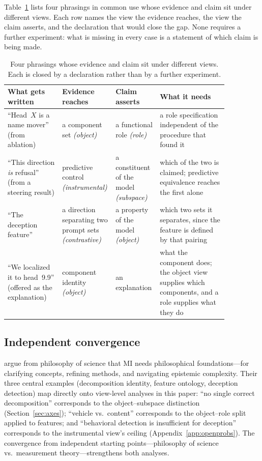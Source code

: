 \documentclass{article}
\begin{document}
Table~\ref{tab:violations} lists four phrasings in common use whose
evidence and claim sit under different views.  Each row names the view the
evidence reaches, the view the claim asserts, and the declaration that
would close the gap.  None requires a further experiment: what is missing
in every case is a statement of which claim is being made.

\begin{table}[H]
\centering
\footnotesize
\begin{tabular}{p{0.24\linewidth}p{0.17\linewidth}p{0.15\linewidth}p{0.30\linewidth}}
\toprule
\textbf{What gets written} & \textbf{Evidence reaches} & \textbf{Claim asserts} & \textbf{What it needs} \\
\midrule
``Head~$X$ is a name mover'' (from ablation)
  & a component set \emph{(object)}
  & a functional role \emph{(role)}
  & a role specification independent of the procedure that found it \\[4pt]
``This direction \emph{is} refusal'' (from a steering result)
  & predictive control \emph{(instrumental)}
  & a constituent of the model \emph{(subspace)}
  & which of the two is claimed; predictive equivalence reaches the first
    alone \\[4pt]
``The deception feature''
  & a direction separating two prompt sets \emph{(contrastive)}
  & a property of the model \emph{(object)}
  & which two sets it separates, since the feature is defined by that
    pairing \\[4pt]
``We localized it to head~9.9'' (offered as the explanation)
  & component identity \emph{(object)}
  & an explanation
  & what the component does; the object view supplies which components,
    and a role supplies what they do \\
\bottomrule
\end{tabular}
\caption{Four phrasings whose evidence and claim sit under different views.
Each is closed by a declaration rather than by a further experiment.}
\label{tab:violations}
\end{table}

\subsection{Independent convergence}

\citet{williams2025} argue from philosophy of science that MI needs
philosophical foundations---for clarifying concepts, refining methods,
and navigating epistemic complexity.  Their three central examples
(decomposition identity, feature ontology, deception detection) map
directly onto view-level analyses in this paper: ``no single correct
decomposition'' corresponds to the object--subspace distinction
(Section~\ref{sec:axes}); ``vehicle vs.\ content'' corresponds to the
object--role split applied to features; and ``behavioral detection is
insufficient for deception'' corresponds to the instrumental view's
ceiling (Appendix~\ref{app:openprobs}).  The convergence from
independent starting points---philosophy of science vs.\ measurement
theory---strengthens both analyses.
\end{document}
